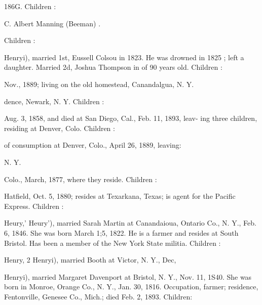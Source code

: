 \documentclass[oneside]{book}
\begin{document}
186G. Children : 






C. Albert Manning (Beeman) . 


Children : 




Henryi), married 1st, Eussell Colsou in 1823. He was drowned 
in 1825 ; left a daughter. Married 2d, Joshua Thompson in 
of 90 years old. Children : 









Nov., 1889; living on the old homestead, Canandalgua, N. Y. 





dence, Newark, N. Y. Children : 










Aug. 3, 1858, and died at San Diego, Cal., Feb. 11, 1893, leav- 
ing three children, residing at Denver, Colo. Children : 





of consumption at Denver, Colo., April 26, 1889, leaving: 


N. Y. 



Colo., March, 1877, where they reside. Children : 






Hatfield, Oct. 5, 1880; resides at Texarkana, Texas; is agent 
for the Pacific Express. Children : 




Heury,' Heury'), married Sarah Martin at Canandaioua, Ontario 
Co., N. Y., Feb. 6, 1846. She was born March 1;5, 1822. He 
is a farmer and resides at South Bristol. Has been a member of 
the New York State militia. Children : 



Henry, 2 Henryi), married Booth at Victor, N. Y., Dec, 



Henryi), married Margaret Davenport at Bristol, N. Y., Nov. 
11, 1S40. She was born in Monroe, Orange Co., N. Y., Jan. 
30, 1816. Occupation, farmer; residence, Fentonville, Genesee 
Co., Mich.; died Feb. 2, 1893. Children: 
\end{document}
